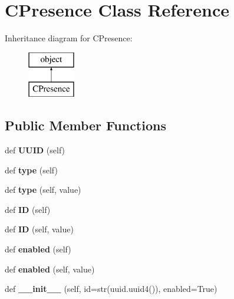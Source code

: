\hypertarget{class_c_presence_1_1_c_presence}{}\section{C\+Presence Class Reference}
\label{class_c_presence_1_1_c_presence}
Inheritance diagram for C\+Presence\+:\begin{figure}[H]
\begin{center}
\leavevmode
\includegraphics[height=2.000000cm]{class_c_presence_1_1_c_presence}
\end{center}
\end{figure}
\subsection*{Public Member Functions}
\begin{DoxyCompactItemize}
\item 
\mbox{\label{class_c_presence_1_1_c_presence_abbcfc1a774079da020e49c42cbadb693}} 
def {\bfseries U\+U\+ID} (self)
\item 
\mbox{\label{class_c_presence_1_1_c_presence_aff464267544e4efc9b770c8320c8f199}} 
def {\bfseries type} (self)
\item 
\mbox{\label{class_c_presence_1_1_c_presence_aca033702f187894894d3102de41d6b99}} 
def {\bfseries type} (self, value)
\item 
\mbox{\label{class_c_presence_1_1_c_presence_adb8818239148d2e5c5833a2b062ee9ad}} 
def {\bfseries ID} (self)
\item 
\mbox{\label{class_c_presence_1_1_c_presence_a0a178fbcae3f6431733dd63ee37ac7bb}} 
def {\bfseries ID} (self, value)
\item 
\mbox{\label{class_c_presence_1_1_c_presence_a05cd4cd28b324f262fefe1a1782bd992}} 
def {\bfseries enabled} (self)
\item 
\mbox{\label{class_c_presence_1_1_c_presence_a18495e0c3f2639c84751c9aa77cd03b3}} 
def {\bfseries enabled} (self, value)
\item 
\mbox{\label{class_c_presence_1_1_c_presence_a71963b9940a29bf3f2c10546c2cb9b50}} 
def {\bfseries \+\_\+\+\_\+init\+\_\+\+\_\+} (self, id=str(uuid.\+uuid4()), enabled=True)
\end{DoxyCompactItemize}


